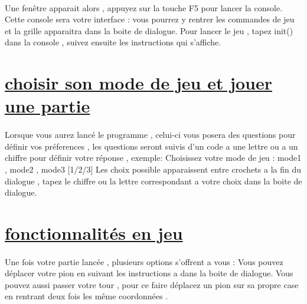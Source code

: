 \documentclass[a4paper,12pt]{article}
\begin{document}
\paragraph{}
Une fenêtre apparait alors , appuyez sur la touche F5 pour lancer la console.
Cette console sera votre interface : vous pourrez y rentrer les commandes de jeu et
la grille apparaitra dans la boite de dialogue.\newline
Pour lancer le jeu , tapez init() dans la console , suivez ensuite les instructions qui s'affiche.
\newline
\newline
\newline

\section{\underline{choisir son mode de jeu et jouer une partie}}
\paragraph{}
Lorsque vous aurez lancé le programme , celui-ci vous posera des questions pour définir vos préferences
, les questions seront suivis d'un code a une lettre ou a un chiffre pour définir votre réponse , exemple:
\newline
Choisissez votre mode de jeu : mode1 , mode2 , mode3 [1/2/3]
\newline 
Les choix possible apparaissent entre crochets a la fin du dialogue , tapez le chiffre ou la lettre correspondant a votre choix dans la boite de dialogue.
\newline
\newline
\newline

\section{\underline{fonctionnalités en jeu}}
\paragraph{}
Une fois votre partie lancée , plusieurs options s'offrent a vous : Vous pouvez déplacer votre pion en suivant les instructions a dans la boite de dialogue. Vous pouvez aussi passer votre tour , pour ce faire déplacez un pion sur sa propre case en rentrant deux fois les même coordonnées .
\newline
\newline
\newline
\end{document}
